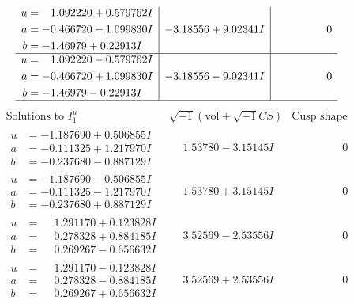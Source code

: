 \documentclass[1p]{elsarticle_modified}
\theoremstyle{definition}
\newcommand{\I}{\sqrt{-1}}
\begin{document}
$$\begin{array}{c|c|c}
\begin{aligned}
u &= \phantom{-}1.092220 + 0.579762 I \\
a &= -0.466720 - 1.099830 I \\
b &= -1.46979 + 0.22913 I\end{aligned}
 & -3.18556 + 9.02341 I & \phantom{-0.000000 } 0 \\ \hline\begin{aligned}
u &= \phantom{-}1.092220 - 0.579762 I \\
a &= -0.466720 + 1.099830 I \\
b &= -1.46979 - 0.22913 I\end{aligned}
 & -3.18556 - 9.02341 I & \phantom{-0.000000 } 0\\
 \hline 
 \end{array}$$\newpage$$\begin{array}{c|c|c}  
\text{Solutions to }I^u_{1}& \I (\text{vol} + \sqrt{-1}CS) & \text{Cusp shape}\\
 \hline 
\begin{aligned}
u &= -1.187690 + 0.506855 I \\
a &= -0.111325 + 1.217970 I \\
b &= -0.237680 - 0.887129 I\end{aligned}
 & \phantom{-}1.53780 - 3.15145 I & \phantom{-0.000000 } 0 \\ \hline\begin{aligned}
u &= -1.187690 - 0.506855 I \\
a &= -0.111325 - 1.217970 I \\
b &= -0.237680 + 0.887129 I\end{aligned}
 & \phantom{-}1.53780 + 3.15145 I & \phantom{-0.000000 } 0 \\ \hline\begin{aligned}
u &= \phantom{-}1.291170 + 0.123828 I \\
a &= \phantom{-}0.278328 + 0.884185 I \\
b &= \phantom{-}0.269267 - 0.656632 I\end{aligned}
 & \phantom{-}3.52569 - 2.53556 I & \phantom{-0.000000 } 0 \\ \hline\begin{aligned}
u &= \phantom{-}1.291170 - 0.123828 I \\
a &= \phantom{-}0.278328 - 0.884185 I \\
b &= \phantom{-}0.269267 + 0.656632 I\end{aligned}
 & \phantom{-}3.52569 + 2.53556 I & \phantom{-0.000000 } 0 \\ \hline\begin{aligned}

\end{aligned}
\end{array}$$
\end{document}
